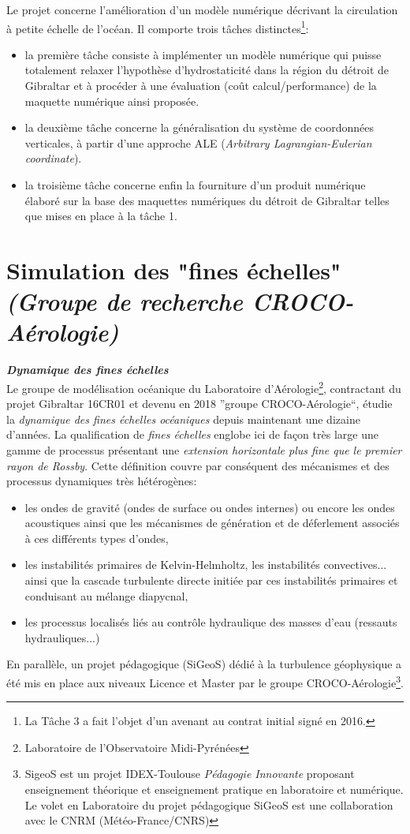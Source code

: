 \documentclass[a4paper,11pt]{report}
\begin{document}
\noindent  Le projet concerne l'amélioration d’un modèle numérique décrivant la circulation à petite échelle de l’océan. Il comporte trois tâches distinctes\footnote{La Tâche 3 a fait l'objet d'un avenant au contrat initial signé en 2016.}:
\begin{itemize}[label=\textbullet]
\item la première tâche consiste à implémenter un modèle numérique qui puisse totalement relaxer l’hypothèse d’hydrostaticité dans la région du détroit de Gibraltar et à procéder à une évaluation (coût calcul/performance) de la maquette numérique ainsi proposée.
\item la deuxième tâche concerne la généralisation du système de coordonnées verticales, à partir d’une approche ALE (\textit{Arbitrary Lagrangian-Eulerian coordinate}).
\item la troisième tâche concerne enfin la fourniture d'un produit numérique élaboré sur la base des maquettes numériques du détroit de Gibraltar telles que mises en place à la tâche 1.
\end{itemize}

\label{simuFE}
\section{Simulation des "fines échelles" \textit{(Groupe de recherche CROCO-Aérologie) }}

\noindent \textit{\textbf{Dynamique des fines échelles}}\\
Le groupe de modélisation océanique du Laboratoire d'Aérologie\footnote{Laboratoire de l'Observatoire Midi-Pyrénées}, contractant du projet Gibraltar 16CR01 et devenu en 2018 ''groupe CROCO-Aérologie``, étudie la \textit{dynamique des fines échelles océaniques} depuis maintenant une dizaine d'années. La qualification de \textit{fines échelles} englobe ici de façon très large une gamme de processus présentant une \textit{extension horizontale plus fine que le premier rayon de Rossby}. Cette définition couvre par conséquent des mécanismes et des processus dynamiques très hétérogènes:
\begin{itemize}
 \item les ondes de gravité (ondes de surface ou ondes internes) ou encore les ondes acoustiques ainsi que les mécanismes de génération et de déferlement associés à ces différents types d'ondes,
 \item les instabilités primaires de Kelvin-Helmholtz, les instabilités convectives... ainsi que la cascade turbulente directe initiée par ces instabilités primaires et conduisant au mélange diapycnal,
 \item les processus localisés liés au contrôle hydraulique des masses d'eau (ressauts hydrauliques...)
\end{itemize}
En parallèle, un projet pédagogique (SiGeoS) dédié à la turbulence géophysique a été mis en place aux niveaux Licence et Master par le groupe CROCO-Aérologie\footnote{SigeoS est un projet IDEX-Toulouse \textit{Pédagogie Innovante} proposant enseignement théorique et enseignement pratique en laboratoire et numérique. Le volet en Laboratoire du projet pédagogique SiGeoS est une collaboration avec le CNRM (Météo-France/CNRS)}. \\
\end{document}
